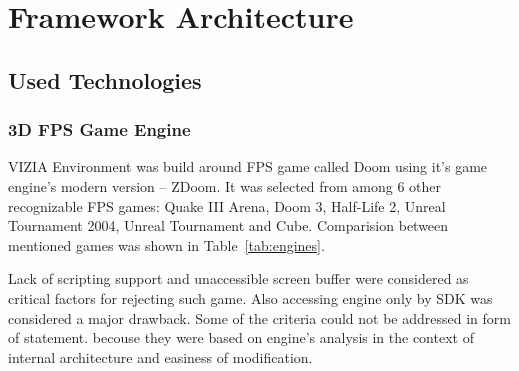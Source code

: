 
\chapter{Framework Architecture}
\label{ch:architecture}
\section{Used Technologies}
\label{sec:technologies}

\subsection{3D FPS Game Engine}


VIZIA Environment was build around FPS game called Doom using it's game engine's modern version -- ZDoom. 
It was selected from among 6 other recognizable FPS games: Quake III Arena, Doom 3, Half-Life 2, Unreal Tournament 2004, Unreal Tournament and Cube.
Comparision between mentioned games was shown in Table~\ref{tab:engines}.


Lack of scripting support and unaccessible screen buffer were considered as critical factors for rejecting such game.
Also accessing engine only by SDK was considered a major drawback.
Some of the criteria could not be addressed in form of statement. becouse they were based on engine's analysis in the context of internal architecture and easiness of modification.


